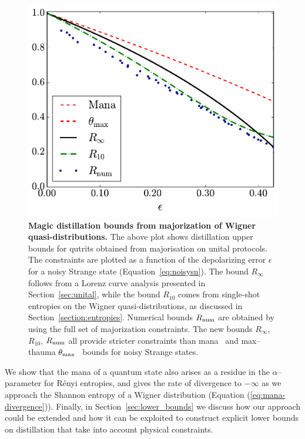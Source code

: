 \documentclass[pra,
aps,
twocolumn,
superscriptaddress,
groupedaddress,
nofootinbib,
reprint
]{revtex4-1}
\begin{document}
\begin{figure}[t]
    \centering
    \includegraphics[scale=0.35]{figs/distill_bounds.pdf}
    \caption{\textbf{Magic distillation bounds from majorization of Wigner quasi-distributions.} The above plot shows distillation upper bounds for qutrits obtained from majorisation on unital protocols. The constraints are plotted as a function of the depolarizing error $\epsilon$ for a noisy Strange state (Equation~\ref{eq:noisysn}). The bound $R_\infty$ follows from a Lorenz curve analysis presented in Section~\ref{sec:unital}, while the bound $R_{10}$ comes from single-shot entropies on the Wigner quasi-distributions, as discussed in Section~\ref{section:entropies}. Numerical bounds $R_{\rm{num}}$ are obtained by using the full set of majorization constraints. The new bounds $R_\infty$, $R_{10}$, $R_{\rm{num}}$ all provide stricter constraints than mana~\cite{cit:veitch2} and max--thauma $\theta_{\rm{max}}$~\cite{Wang_2020} bounds for noisy Strange states.
    }
    \label{fig:distill_bounds}
\end{figure}


We show that the mana of a quantum state also arises as a residue in the $\alpha$--parameter for R\'{e}nyi entropies, and gives the rate of divergence to $-\infty$ as we approach the Shannon entropy of a Wigner distribution (Equation (\ref{eq:mana-divergence})).
Finally, in Section~\ref{sec:lower_bounds} we discuss how our approach could be extended and how it can be exploited to construct explicit lower bounds on distillation that take into account physical constraints.
\end{document}
